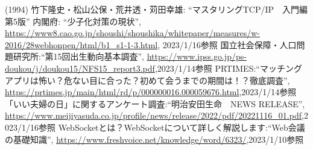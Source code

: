 \documentclass[12pt,a4j,titlepage]{ltjsarticle}
\begin{document}
\clearpage

\begin{thebibliography}{99}
 (1994) 竹下隆史・松山公保・荒井透・苅田幸雄: ``マスタリングTCP/IP　入門編第5版''
 内閣府: ``少子化対策の現状'', \url{https://www8.cao.go.jp/shoushi/shoushika/whitepaper/measures/w-2016/28webhonpen/html/b1_s1-1-3.html}, 2023/1/16参照
国立社会保障・人口問題研究所:``第15回出生動向基本調査'',
\url{https://www.ipss.go.jp/ps-doukou/j/doukou15/NFS15_report3.pdf},2023/1/14参照
PRTIMES:``マッチングアプリは怖い？危ない目に合った？初めて会うまでの期間は！？徹底調査'',
\url{https://prtimes.jp/main/html/rd/p/000000016.000059676.html},2023/1/14参照
「いい夫婦の日」に関するアンケート調査:``明治安田生命　NEWS RELEASE'',
\url{https://www.meijiyasuda.co.jp/profile/news/release/2022/pdf/20221116_01.pdf},2023/1/16参照
WebSocketとは？WebSocketについて詳しく解説します:``Web会議の基礎知識'',
\url{https://www.freshvoice.net/knowledge/word/6323/},2023/1/10参照
\end{thebibliography}
\end{document}
